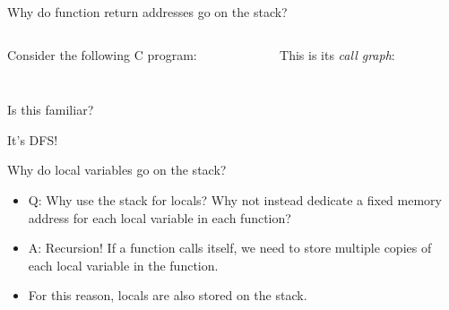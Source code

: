 \documentclass[hyphens,aspectratio=169]{beamer}
\begin{document}
\begin{frame}[fragile]{Why do function return addresses go on the stack?}
    \begin{columns}
        \begin{column}{0.5\textwidth}
            Consider the following C program:
                \inputminted[fontsize=\tiny]{c}{call.c}
        \end{column}
        \begin{column}{0.5\textwidth}
            This is its \textit{call graph}:
            \vspace{1cm}

        \end{column}
    \end{columns}
\end{frame}

\begin{frame}[fragile]{Is this familiar?}
    \pause \begin{center}It's DFS!\end{center}
\end{frame}

\begin{frame}[fragile]{Why do local variables go on the stack?}
    \begin{itemize}
        \pause \item Q: Why use the stack for locals? Why not instead dedicate a fixed memory address for each local variable in each function?
        \pause \item A: Recursion! If a function calls itself, we need to store multiple copies of each local variable in the function.
        \pause \item For this reason, locals are also stored on the stack.
    \end{itemize}
\end{frame}
\end{document}
